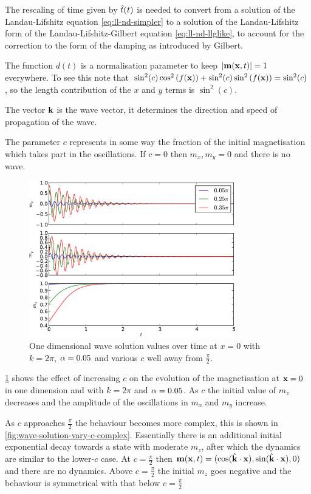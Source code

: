 The rescaling of time given by $\hat{t}(t)$ is needed to convert from a solution of the Landau-Lifshitz equation \cref{eq:ll-nd-simpler} to a solution of the Landau-Lifshitz form of the Landau-Lifshitz-Gilbert equation \cref{eq:ll-nd-llglike}, \ie to account for the correction to the form of the damping as introduced by Gilbert.

The function $d(t)$ is a normalisation parameter to keep $\left|{\mathbf{m}(\mathbf{x}, t)} \right| = 1$ everywhere.
To see this note that $\sin^2(c) \cos^2{\left( f(\mathbf{x}) \right)} + \sin^2(c) \sin^2{\left( f(\mathbf{x}) \right)} = \sin^2(c)$, so the length contribution of the $x$ and $y$ terms is $\sin^2(c)$.

The vector $\mathbf{k}$ is the wave vector, it determines the direction and speed of propagation of the wave.

The parameter $c$ represents in some way the fraction of the initial magnetisation which takes part in the oscillations.
If $c = 0$ then $m_x, m_y = 0$ and there is no wave. 

\begin{figure}
  \centering
  \includegraphics[width=0.8\textwidth]{plots/wave_exact_solution_parameters/exact_solution_parameters.pdf}
  \caption{One dimensional wave solution values over time at $x=0$ with $k = 2\pi$, $\alpha = 0.05$ and various $c$ well away from $\frac{\pi}{2}$.}
  \label{fig:wave-solution-vary-c}
\end{figure}

\cref{fig:wave-solution-vary-c} shows the effect of increasing $c$ on the evolution of the magnetisation at $\mathbf{x} = 0$ in one dimension and with $k = 2\pi$ and $\alpha = 0.05$.
As $c$ the initial value of $m_z$ decreases and the amplitude of the oscillations in $m_x$ and $m_y$ increase.

As $c$ approaches $\frac{\pi}{2}$ the behaviour becomes more complex, this is shown in \cref{fig:wave-solution-vary-c-complex}.
Essentially there is an additional initial exponential decay towards a state with moderate $m_z$, after which the dynamics are similar to the lower-$c$ case.
At $c=\frac{\pi}{2}$ then $\mathbf{m}(\mathbf{x}, t)= (\cos({\hat{\mathbf{k}}}\cdot\mathbf{x}), \sin({\hat{\mathbf{k}}}\cdot\mathbf{x}), 0)$ and there are no dynamics.
Above $c=\frac{\pi}{2}$ the initial $m_z$ goes negative and the behaviour is symmetrical with that below $c=\frac{\pi}{2}$

